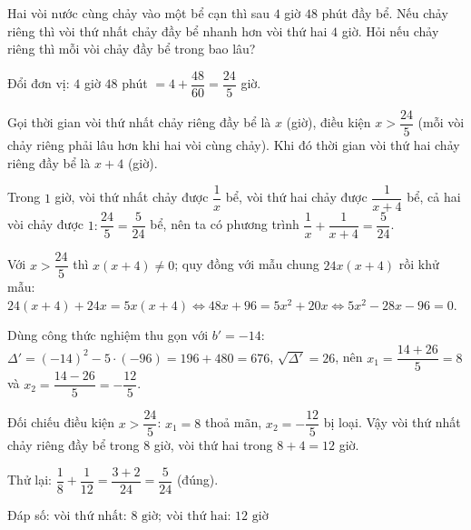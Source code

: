 \begin{problem}[9DS-PT2-031]
Hai vòi nước cùng chảy vào một bể cạn thì sau $4$ giờ $48$ phút đầy bể. Nếu chảy riêng thì vòi thứ nhất chảy đầy bể nhanh hơn vòi thứ hai $4$ giờ. Hỏi nếu chảy riêng thì mỗi vòi chảy đầy bể trong bao lâu?

\begin{solution}
Đổi đơn vị: $4$ giờ $48$ phút $= 4 + \dfrac{48}{60} = \dfrac{24}{5}$ giờ.

Gọi thời gian vòi thứ nhất chảy riêng đầy bể là $x$ (giờ), điều kiện $x > \dfrac{24}{5}$ (mỗi vòi chảy riêng phải lâu hơn khi hai vòi cùng chảy). Khi đó thời gian vòi thứ hai chảy riêng đầy bể là $x + 4$ (giờ).

Trong $1$ giờ, vòi thứ nhất chảy được $\dfrac{1}{x}$ bể, vòi thứ hai chảy được $\dfrac{1}{x + 4}$ bể, cả hai vòi chảy được $1 : \dfrac{24}{5} = \dfrac{5}{24}$ bể, nên ta có phương trình $\dfrac{1}{x} + \dfrac{1}{x + 4} = \dfrac{5}{24}$.

Với $x > \dfrac{24}{5}$ thì $x(x + 4) \neq 0$; quy đồng với mẫu chung $24x(x + 4)$ rồi khử mẫu: $24(x + 4) + 24x = 5x(x + 4) \Leftrightarrow 48x + 96 = 5x^2 + 20x \Leftrightarrow 5x^2 - 28x - 96 = 0$.

Dùng công thức nghiệm thu gọn với $b' = -14$: $\Delta' = (-14)^2 - 5 \cdot (-96) = 196 + 480 = 676$, $\sqrt{\Delta'} = 26$, nên $x_1 = \dfrac{14 + 26}{5} = 8$ và $x_2 = \dfrac{14 - 26}{5} = -\dfrac{12}{5}$.

Đối chiếu điều kiện $x > \dfrac{24}{5}$: $x_1 = 8$ thoả mãn, $x_2 = -\dfrac{12}{5}$ bị loại. Vậy vòi thứ nhất chảy riêng đầy bể trong $8$ giờ, vòi thứ hai trong $8 + 4 = 12$ giờ.

Thử lại: $\dfrac{1}{8} + \dfrac{1}{12} = \dfrac{3 + 2}{24} = \dfrac{5}{24}$ (đúng).

Đáp số: $\boxed{\text{vòi thứ nhất: } 8 \text{ giờ};\ \text{vòi thứ hai: } 12 \text{ giờ}}$
\end{solution}
\end{problem}


